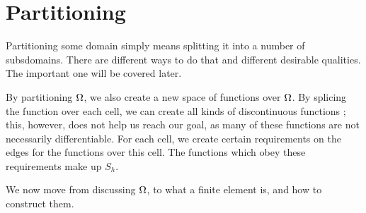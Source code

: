 \section{Partitioning}
Partitioning some domain simply means splitting it into a number of subsdomains. 
There are different ways to do that and different desirable qualities. 
The important one will be covered later.

By partitioning $\Omega$, we also create a new space of functions over $\Omega$. 
By splicing the function over each cell, we can create all kinds of 
discontinuous functions
; this, however, does not help us reach our goal, 
as many of these functions are not necessarily differentiable. 
For each cell, we create certain requirements on the edges for the functions 
over this cell. The functions which obey these requirements make up $S_h$.




We now move from discussing $\Omega$, to what a finite element is,
and how to construct them.